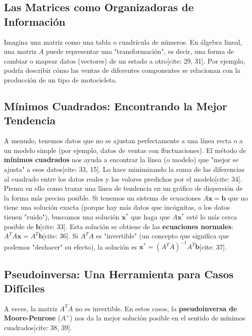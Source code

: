\documentclass[12pt,a4paper]{article}
\begin{document}
\subsection{Las Matrices como Organizadoras de Información}
Imagina una matriz como una tabla o cuadrícula de números. En álgebra lineal, una matriz $A$ puede representar una "transformación", es decir, una forma de cambiar o mapear datos (vectores) de un estado a otro[cite: 29, 31]. Por ejemplo, podría describir cómo las ventas de diferentes componentes se relacionan con la producción de un tipo de motocicleta.

\subsection{Mínimos Cuadrados: Encontrando la Mejor Tendencia}
A menudo, tenemos datos que no se ajustan perfectamente a una línea recta o a un modelo simple (por ejemplo, datos de ventas con fluctuaciones). El método de \textbf{mínimos cuadrados} nos ayuda a encontrar la línea (o modelo) que "mejor se ajusta" a esos datos[cite: 33, 15]. Lo hace minimizando la suma de las diferencias al cuadrado entre los datos reales y los valores predichos por el modelo[cite: 34]. Piensa en ello como trazar una línea de tendencia en un gráfico de dispersión de la forma más precisa posible.
Si tenemos un sistema de ecuaciones $A\mathbf{x} = \mathbf{b}$ que no tiene una solución exacta (porque hay más datos que incógnitas, o los datos tienen "ruido"), buscamos una solución $\mathbf{x}^*$ que haga que $A\mathbf{x}^*$ esté lo más cerca posible de $\mathbf{b}$[cite: 33]. Esta solución se obtiene de las \textbf{ecuaciones normales}: $A^T A \mathbf{x} = A^T \mathbf{b}$[cite: 36]. Si $A^T A$ es "invertible" (un concepto que significa que podemos "deshacer" su efecto), la solución es $\mathbf{x}^* = (A^T A)^{-1} A^T \mathbf{b}$[cite: 37].

\subsection{Pseudoinversa: Una Herramienta para Casos Difíciles}
A veces, la matriz $A^T A$ no es invertible. En estos casos, la \textbf{pseudoinversa de Moore-Penrose} ($A^+$) nos da la mejor solución posible en el sentido de mínimos cuadrados[cite: 38, 39].
\end{document}
